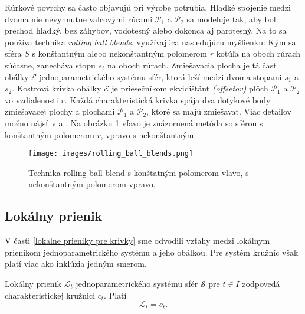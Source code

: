 Rúrkové povrchy sa často objavujú pri výrobe potrubia. Hladké spojenie medzi dvoma nie nevyhnutne valcovými rúrami $\mathcal{P}_1$ a $\mathcal{P}_2$ sa modeluje tak, aby bol prechod hladký, bez záhybov, vodotesný alebo dokonca aj parotesný. Na to sa používa technika \textit{rolling ball blends}, využívajúca nasledujúcu myšlienku: Kým sa sféra $S$ s konštantným alebo nekonštantným polomerom $r$ kotúľa na oboch rúrach súčasne, zanecháva stopu $s_i$ na oboch rúrach. Zmiešavacia plocha je tá časť obálky $\mathcal{E}$ jednoparametrického systému sfér, ktorá leží medzi dvoma stopami $s_1$ a $s_2$. Kostrová krivka obálky $\mathcal{E}$ je priesečníkom ekvidištánt \textit{(offsetov)} plôch $\mathcal{P}_1$ a $\mathcal{P}_2$ vo vzdialenosti $r$. Každá charakteristická krivka spája dva dotykové body zmiešavacej plochy a plochami $\mathcal{P}_1$ a $\mathcal{P}_2$, ktoré sa majú zmiešavať. Viac detailov možno nájsť v \cite{Kar00} a \cite{Ode20}. Na obrázku \ref{fig:rolling_ball_blends} vľavo je znázornená metóda so sférou s konštantným polomerom $r$, vpravo s nekonštantným.

\begin{figure}[H]
	\centering
	\texttt{[image: images/rolling\_ball\_blends.png]}
	\caption[Technika rolling ball blends.]{Technika rolling ball blend s konštatným polomerom vľavo, s nekonštantným polomerom vpravo. \cite{Rollingballblends}}
	\label{fig:rolling_ball_blends}
\end{figure}

\subsection{Lokálny prienik}
V časti \ref{lokalne prieniky pre krivky} sme odvodili vzťahy medzi lokálnym prienikom jednoparametrického systému a jeho obálkou. Pre systém kružníc však platí viac ako inklúzia jedným smerom.

\begin{lemma} \label{lema o lokalnom prieniku sfer}
Lokálny prienik $\mathcal{L}_{t}$ jednoparametrického systému sfér $\mathcal{S}$ pre $t \in I$ zodpovedá charakteristickej kružnici $c_{t}$. Platí $$
\mathcal{L}_{t} = c_{t}.
$$
\end{lemma}

